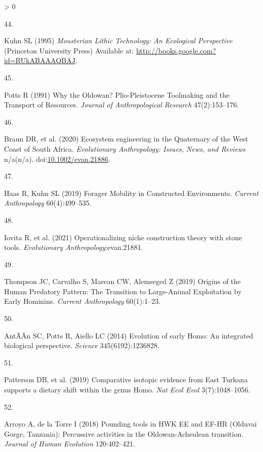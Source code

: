 \documentclass[9pt,twocolumn,twoside,]{pnas-new}
\newlength{\csllabelwidth}
\newlength{\cslhangindent}
\newenvironment{CSLReferences}[3] %
 {%
  \setlength{\parindent}{0pt}
  \ifodd #1 \everypar{\setlength{\hangindent}{\cslhangindent}}\ignorespaces\fi
  \ifnum #2 > 0
  \setlength{\parskip}{#2\baselineskip}
  \fi
 }%
 {}
\newcommand{\CSLLeftMargin}[1]{\parbox[t]{\csllabelwidth}{#1}}
\newcommand{\CSLRightInline}[1]{\parbox[t]{\linewidth - \csllabelwidth}{#1}}
\begin{document}
\begin{CSLReferences}{0}{0}
\leavevmode\hypertarget{ref-kuhnMousterianLithicTechnology1995}{}%
\CSLLeftMargin{44. }
\CSLRightInline{Kuhn SL (1995) \emph{Mousterian {Lithic Technology}: {An
Ecological Perspective}} ({Princeton University Press}) Available at:
\url{http://books.google.com?id=RUkABAAAQBAJ}.}

\leavevmode\hypertarget{ref-pottsWhyOldowanPlioPleistocene1991}{}%
\CSLLeftMargin{45. }
\CSLRightInline{Potts R (1991) Why the {Oldowan}? {Plio}-{Pleistocene
Toolmaking} and the {Transport} of {Resources}. \emph{Journal of
Anthropological Research} 47(2):153--176.}

\leavevmode\hypertarget{ref-braunEcosystemEngineeringQuaternary2020}{}%
\CSLLeftMargin{46. }
\CSLRightInline{Braun DR, et al. (2020) Ecosystem engineering in the
{Quaternary} of the {West Coast} of {South Africa}. \emph{Evolutionary
Anthropology: Issues, News, and Reviews} n/a(n/a).
doi:\href{https://doi.org/10.1002/evan.21886}{10.1002/evan.21886}.}

\leavevmode\hypertarget{ref-haasForagerMobilityConstructed2019}{}%
\CSLLeftMargin{47. }
\CSLRightInline{Haas R, Kuhn SL (2019) Forager {Mobility} in
{Constructed Environments}. \emph{Current Anthropology} 60(4):499--535.}

\leavevmode\hypertarget{ref-iovitaOperationalizingNicheConstruction2021}{}%
\CSLLeftMargin{48. }
\CSLRightInline{Iovita R, et al. (2021) Operationalizing niche
construction theory with stone tools. \emph{Evolutionary
Anthropology}:evan.21881.}

\leavevmode\hypertarget{ref-thompsonOriginsHumanPredatory2019}{}%
\CSLLeftMargin{49. }
\CSLRightInline{Thompson JC, Carvalho S, Marean CW, Alemseged Z (2019)
Origins of the {Human Predatory Pattern}: {The Transition} to
{Large}-{Animal Exploitation} by {Early Hominins}. \emph{Current
Anthropology} 60(1):1--23.}

\leavevmode\hypertarget{ref-antonEvolutionEarlyHomo2014}{}%
\CSLLeftMargin{50. }
\CSLRightInline{AntÃÂn SC, Potts R, Aiello LC (2014) Evolution of early
{Homo}: {An} integrated biological perspective. \emph{Science}
345(6192):1236828.}

\leavevmode\hypertarget{ref-pattersonComparativeIsotopicEvidence2019}{}%
\CSLLeftMargin{51. }
\CSLRightInline{Patterson DB, et al. (2019) Comparative isotopic
evidence from {East Turkana} supports a dietary shift within the genus
{Homo}. \emph{Nat Ecol Evol} 3(7):1048--1056.}

\leavevmode\hypertarget{ref-arroyoPoundingToolsHWK2018}{}%
\CSLLeftMargin{52. }
\CSLRightInline{Arroyo A, de la Torre I (2018) Pounding tools in {HWK
EE} and {EF}-{HR} ({Olduvai Gorge}, {Tanzania}): {Percussive} activities
in the {Oldowan}-{Acheulean} transition. \emph{Journal of Human
Evolution} 120:402--421.}


\end{CSLReferences}
\end{document}
